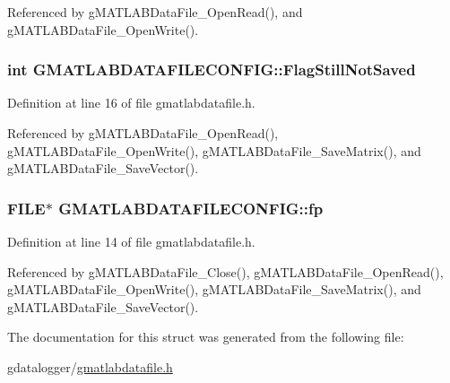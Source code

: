Referenced by gMATLABDataFile\_\-OpenRead(), and gMATLABDataFile\_\-OpenWrite().

\hypertarget{structGMATLABDATAFILECONFIG_a58d1c2a70b22c7c08eccaaea77990db2}{
\subsubsection[{FlagStillNotSaved}]{\setlength{\rightskip}{0pt plus 5cm}int {\bf GMATLABDATAFILECONFIG::FlagStillNotSaved}}}
\label{structGMATLABDATAFILECONFIG_a58d1c2a70b22c7c08eccaaea77990db2}


Definition at line 16 of file gmatlabdatafile.h.



Referenced by gMATLABDataFile\_\-OpenRead(), gMATLABDataFile\_\-OpenWrite(), gMATLABDataFile\_\-SaveMatrix(), and gMATLABDataFile\_\-SaveVector().

\hypertarget{structGMATLABDATAFILECONFIG_a900bde88d01e7b5380101446c89a06a6}{
\subsubsection[{fp}]{\setlength{\rightskip}{0pt plus 5cm}FILE$\ast$ {\bf GMATLABDATAFILECONFIG::fp}}}
\label{structGMATLABDATAFILECONFIG_a900bde88d01e7b5380101446c89a06a6}


Definition at line 14 of file gmatlabdatafile.h.



Referenced by gMATLABDataFile\_\-Close(), gMATLABDataFile\_\-OpenRead(), gMATLABDataFile\_\-OpenWrite(), gMATLABDataFile\_\-SaveMatrix(), and gMATLABDataFile\_\-SaveVector().



The documentation for this struct was generated from the following file:\begin{DoxyCompactItemize}
\item 
gdatalogger/\hyperlink{gmatlabdatafile_8h}{gmatlabdatafile.h}\end{DoxyCompactItemize}
